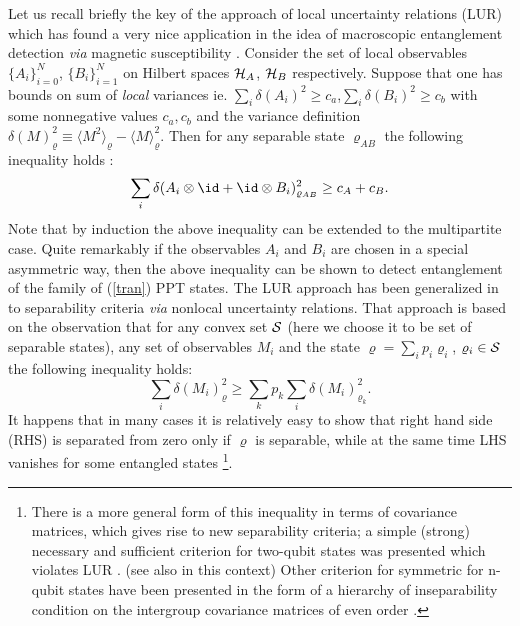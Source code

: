 \documentclass[twocolumn,aps,rmp]{revtex4}
\begin{document}
Let us recall briefly the key of the approach of local uncertainty
relations (LUR) \cite{HofmannT} which has found a very nice
application in the idea of macroscopic entanglement detection {\it
via} magnetic susceptibility \cite{WiesniakVB-Magnetic}. Consider the
set of local observables $\{ A_{i} \}_{i=0}^{N}$, $\{ B_{i}
\}_{i=1}^{N}$ on Hilbert spaces ${\cal H}_{A}$, ${\cal H}_{B}$
respectively. Suppose that one has bounds on sum of {\it local}
variances ie. $\sum_{i} \delta(A_{i})^{2}\geq c_{a}$,$\sum_{i}
\delta(B_{i})^{2}\geq c_{b}$ with some nonnegative values
$c_{a},c_{b}$ and the variance definition
$\delta(M)^{2}_{\varrho}\equiv \langle M^{2} \rangle_{\varrho} -
\langle M \rangle_{\varrho}^{2}$. Then for any separable state
$\varrho_{AB}$ the following inequality holds \cite{HofmannT}:
\begin{equation}
\sum_{i} \delta(A_{i}\otimes \id + \id \otimes
B_{i})_{\varrho_{AB}}^{2}\geq c_{A} + c_{B}.
\end{equation}
Note that by induction the above inequality can be extended to the
multipartite case. Quite remarkably if the observables $A_{i}$ and
$B_{i}$ are chosen in a special asymmetric way, then the above
inequality can be shown \cite{Hoffman2} to detect entanglement of
the family of (\ref{tran}) PPT states. The LUR  approach has been
generalized in \cite{OGuehne} to separability criteria {\it via}
nonlocal uncertainty relations. That approach is based on the
observation that for any convex set ${\cal S}$ (here we choose it to
be set of separable states), any set of observables $M_{i}$ and the
state $\varrho=\sum_{i}p_i\varrho_{i}$, $\varrho_{i}\in {\cal S}$
the following inequality holds:
\begin{equation}
\sum_i \delta(M_i)^{2}_{\varrho} \geq \sum_k p_k \sum_i
\delta(M_i)^{2}_{\varrho_{k}}.
\label{uncertaintyGuehne}
\end{equation}
It happens that in many cases it is relatively easy to show that right
hand side (RHS) is separated from zero only if $\varrho$ is separable,
while at the same time LHS vanishes for some entangled states
\footnote{There is a more general form of this inequality in terms of covariance matrices, which gives rise to new separability criteria;
a simple (strong) necessary and sufficient criterion for two-qubit states
was presented which violates LUR \cite {GuhneHGE2007}.
(see also \cite{AbascalBjork2007-lur-cov} in this context)
 Other criterion for symmetric for n-qubit states
have been presented in the form of a hierarchy of inseparability condition on the intergroup covariance matrices of even order \cite{DeviPR2007}.
}.
\end{document}
